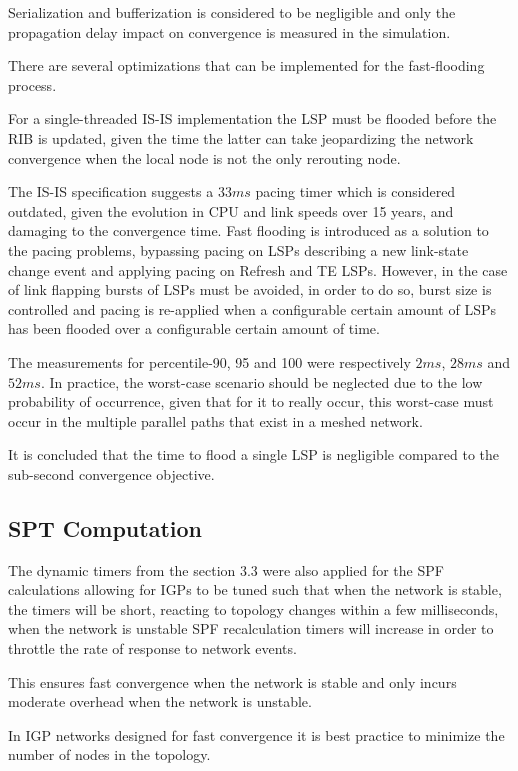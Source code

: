 \documentclass[a4paper, 11pt, UTF8]{article}
\begin{document}
Serialization and bufferization is considered to be negligible and only the propagation delay impact on convergence is measured in the simulation.

There are several optimizations that can be implemented for the fast-flooding process.

For a single-threaded IS-IS implementation the LSP must be flooded before the RIB is updated, given the time the latter can take jeopardizing the network convergence when the local node is not the only rerouting node.

The IS-IS specification suggests a $33ms$ pacing timer which is considered outdated, given the evolution in CPU and link speeds over 15 years, and damaging to the convergence time.
Fast flooding is introduced as a solution to the pacing problems, bypassing pacing on LSPs describing a new link-state change event and applying pacing on Refresh and TE LSPs. 
However, in the case of link flapping bursts of LSPs must be avoided, in order to do so,
burst size is controlled and pacing is re-applied when a configurable certain amount of LSPs has been flooded over a configurable certain amount of time.

The measurements for percentile-90, 95 and 100 were respectively $2ms$, $28ms$ and $52ms$.
In practice, the worst-case scenario should be neglected due to the low probability of occurrence,
given that for it to really occur, this worst-case must occur in the multiple parallel paths that exist in a meshed network.

It is concluded that the time to flood a single LSP is negligible compared to the sub-second convergence objective.

\subsection{SPT Computation}
The dynamic timers from the section 3.3 were also applied for the SPF calculations allowing for IGPs to be tuned such that when the network is stable, 
the timers will be short, reacting to topology changes within a few milliseconds, 
when the network is unstable SPF recalculation timers will increase in order to throttle the rate of response to network events.

This ensures fast convergence when the network is stable and only incurs moderate overhead when the network is unstable.

In IGP networks designed for fast convergence it is best practice to minimize the number of nodes in the topology.
\end{document}
